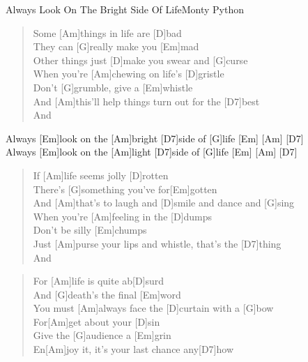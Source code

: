 \begin{song}{Always Look On The Bright Side Of Life}{Monty Python}

    \begin{verse}  
        Some [Am]things in life are [D]bad \\
        They can [G]really make you [Em]mad \\
        [Am]Other things just [D]make you swear and [G]curse \\
        When you're [Am]chewing on life's [D]gristle \\
        Don't [G]grumble, give a [Em]whistle \\
        And [Am]this'll help things turn out for the [D7]best \\
        And
    \end{verse}  

    \begin{chorus}
         [G]Always [Em]look on the [Am]bright [D7]side of [G]life \hspace{1em}[Em] \hspace{1em}[Am] \hspace{1em}[D7] \\
         [G]Always [Em]look on the [Am]light [D7]side of [G]life \hspace{1em}[Em] \hspace{1em}[Am] \hspace{1em}[D7]
        
    \end{chorus}

    \begin{verse}  
        If [Am]life seems jolly [D]rotten \\
        There's [G]something you've for[Em]gotten \\
        And [Am]that's to laugh and [D]smile and dance and [G]sing \\
        When you're [Am]feeling in the [D]dumps \\
        [G]Don't be silly [Em]chumps \\
        Just [Am]purse your lips and whistle, that's the [D7]thing \\
        And
    \end{verse}  


    \begin{verse}  
        For [Am]life is quite ab[D]surd \\
        And [G]death's the final [Em]word \\
        You must [Am]always face the [D]curtain with a [G]bow \\
        For[Am]get about your [D]sin \\
        Give the [G]audience a [Em]grin \\
        En[Am]joy it, it's your last chance any[D7]how 
    \end{verse}  


\end{song}
